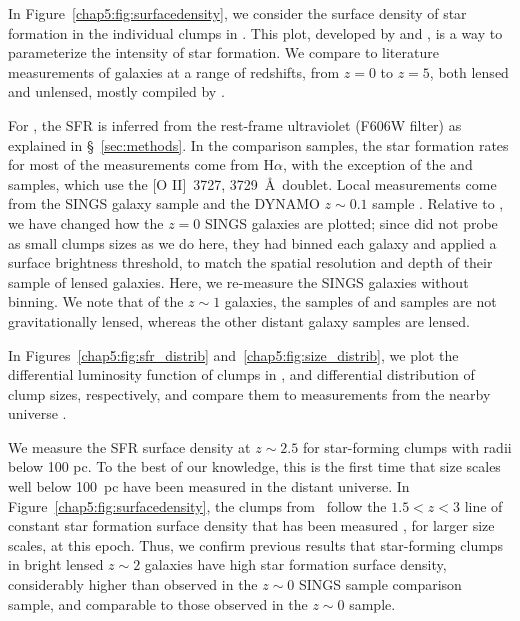 In Figure~\ref{chap5:fig:surfacedensity}, we consider the surface density of star formation
in the individual clumps in \arcname.
This plot, developed by \citet{Livermore:2012fk} and \citet{Livermore:2015ve}, 
is a way to parameterize the intensity of star formation.
We compare to literature measurements of galaxies at
a range of redshifts, from $z=0$ to $z=5$, both lensed and unlensed, 
mostly compiled by  \citet{Livermore:2015ve}.

For \arcname, the SFR is inferred from the rest-frame ultraviolet
(F606W filter) as explained in \S~\ref{sec:methods}.
In the comparison samples, the star formation rates for most of the
measurements come from H$\alpha$, 
with the exception of the \citet{Swinbank:2007wj} and
\citet{Swinbank:2009lk} samples, 
which use the [O II]~3727, 3729~\AA\ doublet. 
Local measurements come from the SINGS galaxy sample \citep{Kennicutt:2003xq} and 
the DYNAMO $z\sim 0.1$ sample \citep{Fisher:2017tk}.  
Relative to \citet{Livermore:2015ve}, we have changed how the $z=0$ SINGS galaxies 
are plotted; since \citet{Livermore:2015ve} did not probe as small
clumps sizes as we do here, they had binned each galaxy and applied a surface brightness threshold,  
to match the spatial resolution and depth of their sample of lensed galaxies.
Here, we re-measure the SINGS galaxies without binning.  %
We note that of the $z\sim 1$ galaxies, the %
samples of  \citet{Swinbank:2012jk} and %
\citet{Wisnioski:2012qf} samples are not gravitationally lensed, whereas 
the other distant galaxy samples are lensed. 

In Figures~\ref{chap5:fig:sfr_distrib} and~\ref{chap5:fig:size_distrib}, we plot the differential luminosity
function of clumps in \arcname, and differential distribution of clump
sizes, respectively, and compare them to measurements from the nearby universe \citep{Liu:2013qy}.

We measure the SFR surface density at $z\sim2.5$ for star-forming clumps 
with radii below 100 pc.  To the best of our knowledge, this is the first time 
that size scales well below 100~pc have been measured in the distant universe. 
In Figure~\ref{chap5:fig:surfacedensity}, the clumps from \arcname\ 
follow the $1.5<z<3$ line of constant star formation surface density 
that has been measured \citep{Livermore:2015ve},  for larger size scales, at this epoch.
Thus, we confirm previous results \citep{Livermore:2012fk, Livermore:2015ve} 
that star-forming clumps in bright lensed
$z\sim2$ galaxies have high star formation surface density, 
considerably higher than observed in the  $z\sim 0$ 
SINGS sample \citep{Kennicutt:2003xq} comparison sample, and 
comparable to those observed in the $z\sim 0$ \citet{Fisher:2017tk} sample.

